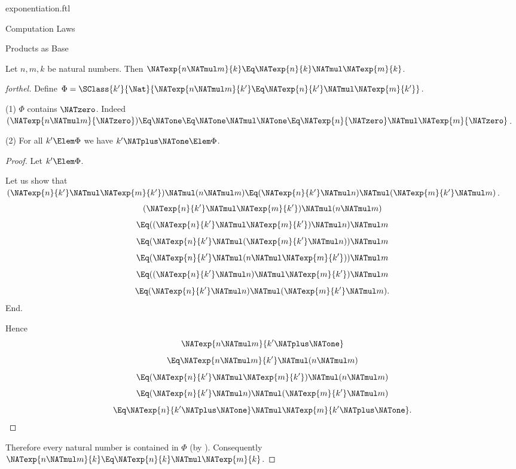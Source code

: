\documentclass{stex}
\begin{document}
\begin{smodule}{exponentiation.ftl}
\begin{sfragment}{Computation Laws}
  \begin{sfragment}{Products as Base}
    \begin{proposition}[forthel,id=ARITHMETIC_09_2563032276271104]
      Let $n, m, k$ be natural numbers.
      Then $\NATexp{n \NATmul m}{k} \Eq \NATexp{n}{k} \NATmul \NATexp{m}{k}$.
    \end{proposition}
    \begin{proof}[forthel]
      Define $\Phi = \SClass{k'}{\Nat}{\NATexp{n \NATmul m}{k'} \Eq \NATexp{n}{k'} \NATmul \NATexp{m}{k'}}$.

      (1) $\Phi$ contains $\NATzero$.
      Indeed $(\NATexp{n \NATmul m}{\NATzero})
        \Eq \NATone
        \Eq \NATone \NATmul \NATone
        \Eq \NATexp{n}{\NATzero} \NATmul \NATexp{m}{\NATzero}$. %

      (2) For all $k' \Elem \Phi$ we have $k' \NATplus \NATone \Elem \Phi$.
      \begin{proof}
        Let $k' \Elem \Phi$.

        Let us show that $(\NATexp{n}{k'} \NATmul \NATexp{m}{k'}) \NATmul (n \NATmul m) \Eq (\NATexp{n}{k'} \NATmul n) \NATmul (\NATexp{m}{k'} \NATmul m)$.
          \[  (\NATexp{n}{k'} \NATmul \NATexp{m}{k'}) \NATmul (n \NATmul m)       \]
          \[    \Eq ((\NATexp{n}{k'} \NATmul \NATexp{m}{k'}) \NATmul n) \NATmul m   \]
          \[    \Eq (\NATexp{n}{k'} \NATmul (\NATexp{m}{k'} \NATmul n)) \NATmul m   \]
          \[    \Eq (\NATexp{n}{k'} \NATmul (n \NATmul \NATexp{m}{k'})) \NATmul m   \]
          \[    \Eq ((\NATexp{n}{k'} \NATmul n) \NATmul \NATexp{m}{k'}) \NATmul m   \]
          \[    \Eq (\NATexp{n}{k'} \NATmul n) \NATmul (\NATexp{m}{k'} \NATmul m).  \]
        End.

        Hence
        \[  \NATexp{n \NATmul m}{k' \NATplus \NATone}                          \]
        \[    \Eq \NATexp{n \NATmul m}{k'} \NATmul (n \NATmul m)        \]
        \[    \Eq (\NATexp{n}{k'} \NATmul \NATexp{m}{k'}) \NATmul (n \NATmul m)   \]
        \[    \Eq (\NATexp{n}{k'} \NATmul n) \NATmul (\NATexp{m}{k'} \NATmul m)   \]
        \[    \Eq \NATexp{n}{k' \NATplus \NATone} \NATmul \NATexp{m}{k' \NATplus \NATone}.              \]
      \end{proof}

      Therefore every natural number is contained in $\Phi$ (by ).
      Consequently $\NATexp{n \NATmul m}{k} \Eq \NATexp{n}{k} \NATmul \NATexp{m}{k}$.
    \end{proof}
  \end{sfragment}


\end{sfragment}
\end{smodule}
\end{document}
